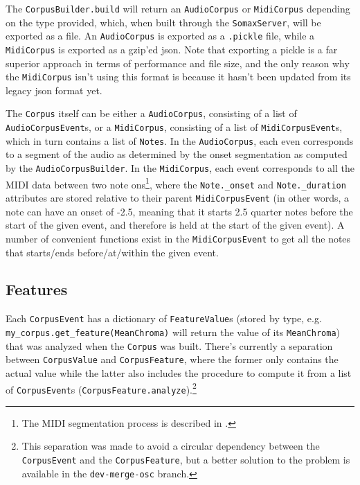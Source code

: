 The \texttt{CorpusBuilder.build} will return an \texttt{AudioCorpus} or \texttt{MidiCorpus} depending on the type provided, which, when built through the \texttt{SomaxServer}, will be exported as a file. An \texttt{AudioCorpus} is exported as a \texttt{.pickle} file, while a \texttt{MidiCorpus} is exported as a gzip'ed json. Note that exporting a pickle is a far superior approach in terms of performance and file size, and the only reason why the \texttt{MidiCorpus} isn't using this format is because it hasn't been updated from its legacy json format yet.

The \texttt{Corpus} itself can be either a \texttt{AudioCorpus}, consisting of a list of \texttt{AudioCorpusEvent}s, or a \texttt{MidiCorpus}, consisting of a list of \texttt{MidiCorpusEvent}s, which in turn contains a list of \texttt{Notes}. In the \texttt{AudioCorpus}, each even corresponds to a segment of the audio as determined by the onset segmentation as computed by the \texttt{AudioCorpusBuilder}. In the \texttt{MidiCorpus}, each event corresponds to all the MIDI data between two note ons\footnote{The MIDI segmentation process is described in \cite{somaxtheory2021}.}, where the \texttt{Note.\_onset} and \texttt{Note.\_duration} attributes are stored relative to their parent \texttt{MidiCorpusEvent} (in other words, a note can have an onset of -2.5, meaning that it starts 2.5 quarter notes before the start of the given event, and therefore is held at the start of the given event). A number of convenient functions exist in the \texttt{MidiCorpusEvent} to get all the notes that starts/ends before/at/within the given event.

\subsection{Features}\label{ssec:2-features}
Each \texttt{CorpusEvent} has a dictionary of \texttt{FeatureValue}s (stored by type, e.g. \\\texttt{my\_corpus.get\_feature(MeanChroma)} will return the value of its \texttt{MeanChroma}) that was analyzed when the \texttt{Corpus} was built. There's currently a separation between \texttt{CorpusValue} and \texttt{CorpusFeature}, where the former only contains the actual value while the latter also includes the procedure to compute it from a list of \texttt{CorpusEvent}s (\texttt{CorpusFeature.analyze}).\footnote{This separation was made to avoid a circular dependency between the \texttt{CorpusEvent} and the \texttt{CorpusFeature}, but a better solution to the problem is available in the \texttt{dev-merge-osc} branch.}


